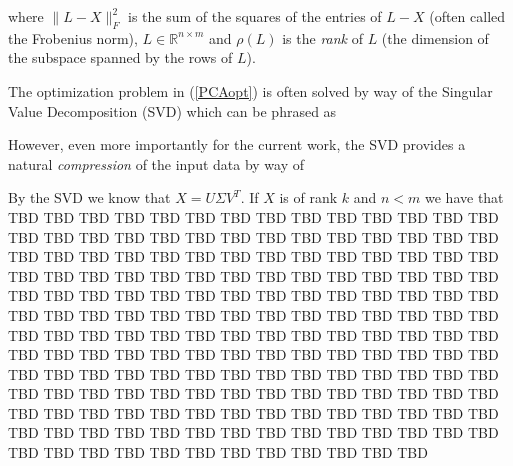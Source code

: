 \documentclass[conference]{IEEEtran}
\begin{document}
\noindent where $\| L-X \|_F^2$ is the sum of the squares of the entries of $L-X$ (often called the Frobenius norm), $L \in \mathbb{R}^{n \times m}$ and $\rho(L)$ is the \emph{rank} of $L$
(the dimension of the subspace spanned by the rows of $L$).

The optimization problem in (\ref{PCAopt}) is often solved by way of the Singular Value
Decomposition (SVD) \cite{Eckart1936} which can be phrased as


However, even more importantly for the current work, the SVD provides a natural \emph{compression} of the input data by way of


By the SVD we know that $X=U \Sigma V^T$.  If $X$ is of rank $k$ and $n<m$ we have that 
TBD TBD TBD TBD TBD TBD TBD TBD TBD TBD TBD TBD TBD TBD TBD TBD TBD TBD TBD TBD
TBD TBD TBD TBD TBD TBD TBD TBD TBD TBD TBD TBD TBD TBD TBD TBD TBD TBD TBD TBD
TBD TBD TBD TBD TBD TBD TBD TBD TBD TBD TBD TBD TBD TBD TBD TBD TBD TBD TBD TBD
TBD TBD TBD TBD TBD TBD TBD TBD TBD TBD TBD TBD TBD TBD TBD TBD TBD TBD TBD TBD
TBD TBD TBD TBD TBD TBD TBD TBD TBD TBD TBD TBD TBD TBD TBD TBD TBD TBD TBD TBD
TBD TBD TBD TBD TBD TBD TBD TBD TBD TBD TBD TBD TBD TBD TBD TBD TBD TBD TBD TBD
TBD TBD TBD TBD TBD TBD TBD TBD TBD TBD TBD TBD TBD TBD TBD TBD TBD TBD TBD TBD
TBD TBD TBD TBD TBD TBD TBD TBD TBD TBD TBD TBD TBD TBD TBD TBD TBD TBD TBD TBD
TBD TBD TBD TBD TBD TBD TBD TBD TBD TBD TBD TBD TBD TBD TBD TBD TBD TBD TBD TBD
\end{document}
